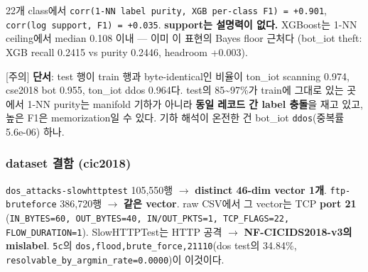22개 class에서 \texttt{corr(1-\allowbreak{}N\allowbreak{}N label \allowbreak{}purity,\allowbreak{} \allowbreak{}XGB per-\allowbreak{}class F1\allowbreak{}) =\allowbreak{}\allowbreak{} +\allowbreak{}\allowbreak{}0.\allowbreak{}9\allowbreak{}01}, \texttt{corr(log\allowbreak{} support\allowbreak{},\allowbreak{} F1) =\allowbreak{}\allowbreak{} \allowbreak{}+\allowbreak{}\allowbreak{}0.\allowbreak{}035}. \textbf{support는 설명력이 없다.} XGBoost는 1-NN ceiling에서 median 0.108 이내 — 이미 이 표현의 Bayes floor 근처다 (bot\_\allowbreak{}iot theft: XGB recall 0.2415 vs purity 0.2446, headroom +\allowbreak{}0.003).

[주의] \textbf{단서}: test 행이 train 행과 byte-identical인 비율이 ton\_\allowbreak{}iot scanning 0.974, cse2018 bot 0.955, ton\_\allowbreak{}iot ddos 0.964다. test의 85\textasciitilde{}97\%가 train에 그대로 있는 곳에서 1-NN purity는 manifold 기하가 아니라 \textbf{동일 레코드 간 label 충돌}을 재고 있고, 높은 F1은 memorization일 수 있다. 기하 해석이 온전한 건 bot\_\allowbreak{}iot \texttt{ddos}(중복률 5.6e-06) 하나.

\subsubsection{dataset 결함 (cic2018)}
\texttt{dos\_\allowbreak{}\allowbreak{}atta\allowbreak{}cks-\allowbreak{}slow\allowbreak{}httptest\allowbreak{}} 105,550행  \ensuremath{\rightarrow}  \textbf{distinct 46-dim vector 1개}. \texttt{ftp-\allowbreak{}brut\allowbreak{}eforce} 386,720행  \ensuremath{\rightarrow}  \textbf{같은 vector}. raw CSV에서 그 vector는 TCP \textbf{port 21} (\texttt{IN\_\allowbreak{}\allowbreak{}BYTES\allowbreak{}=\allowbreak{}\allowbreak{}60,\allowbreak{} OUT\allowbreak{}\_\allowbreak{}\allowbreak{}BYTES=\allowbreak{}\allowbreak{}4\allowbreak{}0,\allowbreak{} IN/\allowbreak{}\allowbreak{}OU\allowbreak{}T\_\allowbreak{}\allowbreak{}PKTS=\allowbreak{}\allowbreak{}1\allowbreak{},\allowbreak{} TCP\_\allowbreak{}\allowbreak{}FL\allowbreak{}AGS=\allowbreak{}\allowbreak{}22,\allowbreak{} \allowbreak{}FLOW\_\allowbreak{}\allowbreak{}DUR\allowbreak{}ATION=\allowbreak{}\allowbreak{}1}). SlowHTTPTest는 HTTP 공격  \ensuremath{\rightarrow}  \textbf{NF-CICIDS2018-v3의 mislabel}. \texttt{5c}의 \texttt{dos,\allowbreak{}floo\allowbreak{}d,\allowbreak{}brute\_\allowbreak{}\allowbreak{}force,\allowbreak{}21\allowbreak{}110}(dos test의 34.84\%, \texttt{resolvab\allowbreak{}le\_\allowbreak{}\allowbreak{}by\_\allowbreak{}\allowbreak{}ar\allowbreak{}gmin\_\allowbreak{}\allowbreak{}rat\allowbreak{}e=\allowbreak{}\allowbreak{}0.\allowbreak{}0000\allowbreak{}})이 이것이다.


